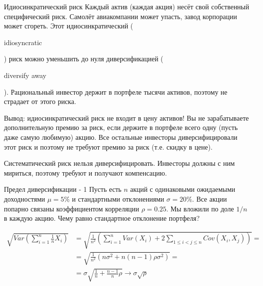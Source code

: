 \documentclass{beamer}
\newcommand{\en}[1]{\begin{otherlanguage}{english}#1\end{otherlanguage}}
\begin{document}
\begin{frame}{Идиосинкратический риск}
\justify
Каждый актив (каждая акция) несёт свой собственный специфический риск. Самолёт 
авиакомпании может упасть, завод корпорации может сгореть. Этот 
идиосинкратический (\en{idiosyncratic}) риск можно уменьшить до нуля 
диверсификацией (\en{diversify away}). Рациональный инвестор держит в портфеле 
тысячи активов, поэтому не страдает от этого риска.

\justify
Вывод: идиосинкратический риск не входит в цену активов! Вы не зарабатываете 
дополнительную премию за риск, если держите в портфеле всего одну (пусть даже 
самую любимую) акцию. Все остальные инвесторы диверсифицировали этот риск и 
поэтому не требуют премию за риск (т.е. скидку в цене).

\justify
Систематический риск нельзя диверсифицировать. Инвесторы должны с ним мириться, 
поэтому требуют и получают компенсацию.
\end{frame}




\begin{frame}{Предел диверсификации - 1}
\justify
Пусть есть $n$ акций с одинаковыми ожидаемыми доходностями $\mu=5\%$ и 
стандартными отклонениями $\sigma = 20\%$. Все акции попарно связаны 
коэффициентом корреляции $\rho=0.25$. Мы вложили по доле $1/n$ в каждую акцию. 
Чему равно стандартное отклонение портфеля?

\begin{align*}
\sqrt{Var\left(\sum\limits_{i=1}^{n}\frac{1}{n}X_i \right)} &=
\sqrt{\frac{1}{n^2}\left(\sum\limits_{i=1}^{n}Var(X_i) + 2\sum\limits_{
1 \le i < j \le n}Cov(X_i, X_j)\right)} = \\
&= \sqrt{\frac{1}{n^2}\left(n\sigma^2 + n(n-1)\rho\sigma^2\right)} = \\
&= \sigma\sqrt{\frac{1}{n} + \frac{n-1}{n}\rho} \to \sigma\sqrt{\rho}
\end{align*}
\end{frame}
\end{document}
